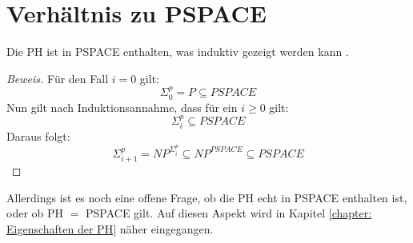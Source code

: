 \section{Verhältnis zu PSPACE}
Die PH ist in PSPACE enthalten, was induktiv gezeigt werden kann \cite{rothe_komplexitatstheorie_2008}.
\begin{proof}[Beweis] \cite[S.320]{rothe_komplexitatstheorie_2008}
Für den Fall $i = 0$ gilt: 
    \begin{equation}
        \Sigma^p_0 = P \subseteq PSPACE
    \end{equation}
    Nun gilt nach Induktionsannahme, dass für ein $i \geq 0$ gilt:
    \begin{equation}
        \Sigma^p_i \subseteq PSPACE
    \end{equation}
    Daraus folgt:
    \begin{equation}
        \Sigma^p_{i+1} = NP^{\Sigma^p_i} \subseteq NP^{PSPACE} \subseteq PSPACE
    \end{equation}
\end{proof}
Allerdings ist es noch eine offene Frage, ob die PH echt in PSPACE enthalten ist, oder ob PH $=$ PSPACE \cite{rothe_komplexitatstheorie_2008} gilt.
Auf diesen Aspekt wird in Kapitel \ref{chapter: Eigenschaften der PH} näher eingegangen.



